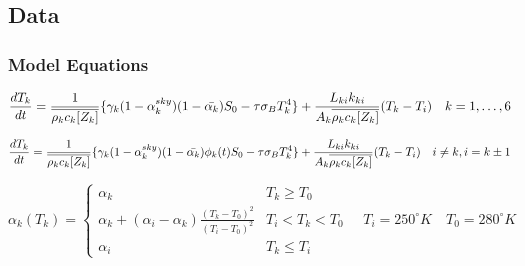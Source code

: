 \documentclass{article}
\newcommand*\mean[1]{\overline{#1}}
\begin{document}
\subsection{Data}
\subsubsection{Model Equations}
\label{sec:eqns}
\begin{equation} \label{eqn:dtk}
  \frac{dT_k}{dt} = \frac{1}{\mean{\rho_kc_k[Z_k]}}
  \{
    \gamma_k(1-\alpha_k^{sky})(1-\Bar{\alpha_k})S_0-\tau\sigma_BT_k^{4}
  \} +
  \frac{L_{ki}k_{ki}}{{A_k}\mean{\rho_kc_k[Z_k]}}(T_{k}-T_{i}) \quad k=1,\dots,6
\end{equation}

\begin{equation} \label{eqn:dtkphi}
  \frac{dT_k}{dt} = \frac{1}{\mean{\rho_kc_k[Z_k]}}
  \{
    \gamma_k(1-\alpha_k^{sky})(1-\Bar{\alpha_k})\phi_k(t)S_0-\tau\sigma_BT_k^{4}
  \} +
  \frac{L_{ki}k_{ki}}{{A_k}\mean{\rho_kc_k[Z_k]}}(T_{k}-T_{i})
  \quad i \neq k, i = k \pm 1
\end{equation}

\begin{equation} \label{eqn:albedoparam}
  \alpha_k(T_k) =
    \begin{cases}
    \alpha_k & T_k \geq T_0 \\
    \alpha_k + (\alpha_i-\alpha_k)\frac{(T_k-T_0)^2}{(T_i-T_0)^2}
    & T_i < T_k < T_0 \\
    \alpha_i & T_k \leq T_i
    \end{cases}
    \quad T_i = 250^{\circ}K \quad T_0 = 280^{\circ}K
\end{equation}
\end{document}
